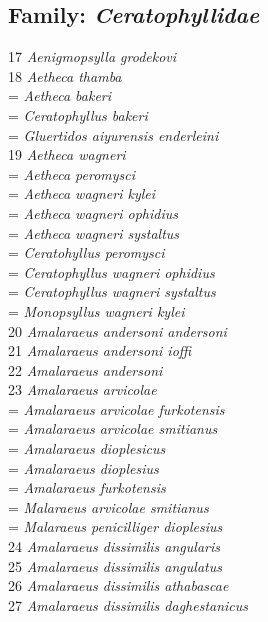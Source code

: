 \documentclass[
]{article}
\begin{document}
\hypertarget{family-ceratophyllidae-1}{%
\subsection{\texorpdfstring{Family:
\emph{Ceratophyllidae}}{Family: Ceratophyllidae}}\label{family-ceratophyllidae-1}}

17 \emph{Aenigmopsylla grodekovi}\\
18 \emph{Aetheca thamba}\\
= \emph{Aetheca bakeri}\\
= \emph{Ceratophyllus bakeri}\\
= \emph{Gluertidos aiyurensis enderleini}\\
19 \emph{Aetheca wagneri}\\
= \emph{Aetheca peromysci}\\
= \emph{Aetheca wagneri kylei}\\
= \emph{Aetheca wagneri ophidius}\\
= \emph{Aetheca wagneri systaltus}\\
= \emph{Ceratohyllus peromysci}\\
= \emph{Ceratophyllus wagneri ophidius}\\
= \emph{Ceratophyllus wagneri systaltus}\\
= \emph{Monopsyllus wagneri kylei}\\
20 \emph{Amalaraeus andersoni andersoni}\\
21 \emph{Amalaraeus andersoni ioffi}\\
22 \emph{Amalaraeus andersoni}\\
23 \emph{Amalaraeus arvicolae}\\
= \emph{Amalaraeus arvicolae furkotensis}\\
= \emph{Amalaraeus arvicolae smitianus}\\
= \emph{Amalaraeus dioplesicus}\\
= \emph{Amalaraeus dioplesius}\\
= \emph{Amalaraeus furkotensis}\\
= \emph{Malaraeus arvicolae smitianus}\\
= \emph{Malaraeus penicilliger dioplesius}\\
24 \emph{Amalaraeus dissimilis angularis}\\
25 \emph{Amalaraeus dissimilis angulatus}\\
26 \emph{Amalaraeus dissimilis athabascae}\\
27 \emph{Amalaraeus dissimilis daghestanicus}\\
\end{document}
